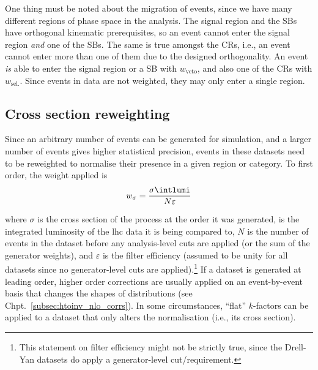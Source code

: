 One thing must be noted about the migration of events, since we have many different regions of phase space in the analysis. The signal region and the \glspl{SB} have orthogonal kinematic prerequisites, so an event cannot enter the signal region \emph{and} one of the \glspl{SB}. The same is true amongst the \glspl{CR}, i.e., an event cannot enter more than one of them due to the designed orthogonality. An event \emph{is} able to enter the signal region or a \gls{SB} with $w_{\mathrm{veto}}$, and also one of the \glspl{CR} with $w_{\mathrm{sel.}}$. Since events in data are not weighted, they may only enter a single region.





\subsection{Cross section reweighting}
\label{subsec:xs_weighting}

Since an arbitrary number of events can be generated for simulation, and a larger number of events gives higher statistical precision, events in these datasets need to be reweighted to normalise their presence in a given region or category. To first order, the weight applied is
\begin{equation}
    w_{\sigma} = \frac{ \sigma \intlumi }{ N \varepsilon }
    \label{eq:xs_weight}
\end{equation}

where $\sigma$ is the cross section of the process at the order it was generated, \intlumi is the integrated luminosity of the \acrshort{lhc} data it is being compared to, $N$ is the number of events in the dataset before any analysis-level cuts are applied (or the sum of the generator weights), and $\varepsilon$ is the filter efficiency (assumed to be unity for all datasets since no generator-level cuts are applied).\footnote{This statement on filter efficiency might not be strictly true, since the Drell-Yan datasets do apply a generator-level cut/requirement.} If a dataset is generated at leading order, higher order corrections are usually applied on an event-by-event basis that changes the shapes of distributions (see Chpt.~\ref{subsec:htoinv_nlo_corrs}). In some circumstances, ``flat'' $k$-factors can be applied to a dataset that only alters the normalisation (i.e., its cross section).


